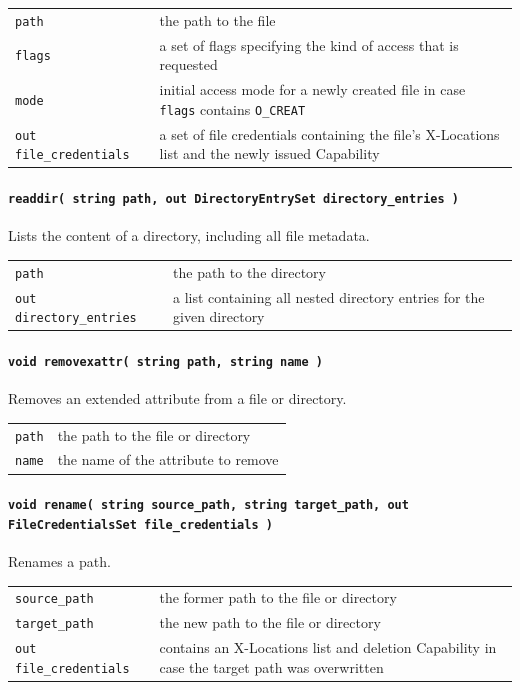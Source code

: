 \begin{tabularx}{\textwidth}{lX}
 \texttt{path} & the path to the file\\
 \texttt{flags} & a set of flags specifying the kind of access that is requested\\
 \texttt{mode} & initial access mode for a newly created file in case \texttt{flags} contains \texttt{O\_CREAT}\\
 \texttt{out file\_credentials} & a set of file credentials containing the file's X-Locations list and the newly issued Capability\\
\end{tabularx}

\paragraph{\texttt{readdir( string path, out DirectoryEntrySet directory\_entries )}}
Lists the content of a directory, including all file metadata.

\begin{tabularx}{\textwidth}{lX}
 \texttt{path} & the path to the directory\\
 \texttt{out directory\_entries} & a list containing all nested directory entries for the given directory\\
\end{tabularx}

\paragraph{\texttt{void removexattr( string path, string name )}}
Removes an extended attribute from a file or directory.

\begin{tabularx}{\textwidth}{lX}
 \texttt{path} & the path to the file or directory\\
 \texttt{name} & the name of the attribute to remove\\
\end{tabularx}

\paragraph{\texttt{void rename( string source\_path, string target\_path, out FileCredentialsSet file\_credentials )}}
Renames a path.

\begin{tabularx}{\textwidth}{lX}
 \texttt{source\_path} & the former path to the file or directory\\
 \texttt{target\_path} & the new path to the file or directory\\
 \texttt{out file\_credentials} & contains an X-Locations list and deletion Capability in case the target path was overwritten\\
\end{tabularx}

